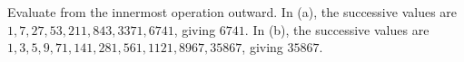 Evaluate from the innermost operation outward. In (a), the successive values are $1,7,27,53,211,843,3371,6741$, giving $\boxed{6741}$. In (b), the successive values are $1,3,5,9,71,141,281,561,1121,8967,35867$, giving $\boxed{35867}$.
